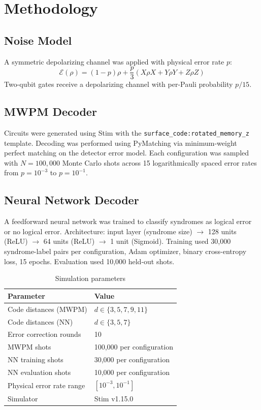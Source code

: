 \documentclass[12pt,a4paper]{article}
\begin{document}
\section{Methodology}

\subsection{Noise Model}
A symmetric depolarizing channel was applied with physical error rate $p$:
\begin{equation}
\mathcal{E}(\rho) = (1-p)\rho + \frac{p}{3}(X\rho X + Y\rho Y + Z\rho Z)
\end{equation}
Two-qubit gates receive a depolarizing channel with per-Pauli probability $p/15$.

\subsection{MWPM Decoder}
Circuits were generated using Stim \cite{gidney2021} with the
\texttt{surface\_code:rotated\_memory\_z} template. Decoding was performed using
PyMatching \cite{higgott2022} via minimum-weight perfect matching on the detector
error model. Each configuration was sampled with $N=100{,}000$ Monte Carlo shots
across 15 logarithmically spaced error rates from $p=10^{-3}$ to $p=10^{-1}$.

\subsection{Neural Network Decoder}
A feedforward neural network was trained to classify syndromes as logical error
or no logical error. Architecture: input layer (syndrome size) $\to$ 128 units
(ReLU) $\to$ 64 units (ReLU) $\to$ 1 unit (Sigmoid). Training used 30,000
syndrome-label pairs per configuration, Adam optimizer, binary cross-entropy loss,
15 epochs. Evaluation used 10,000 held-out shots.

\begin{table}[h]
\centering
\caption{Simulation parameters}
\begin{tabular}{ll}
\toprule
Parameter & Value \\
\midrule
Code distances (MWPM) & $d \in \{3, 5, 7, 9, 11\}$ \\
Code distances (NN) & $d \in \{3, 5, 7\}$ \\
Error correction rounds & 10 \\
MWPM shots & 100,000 per configuration \\
NN training shots & 30,000 per configuration \\
NN evaluation shots & 10,000 per configuration \\
Physical error rate range & $[10^{-3}, 10^{-1}]$ \\
Simulator & Stim v1.15.0 \\
\bottomrule
\end{tabular}
\end{table}
\end{document}
